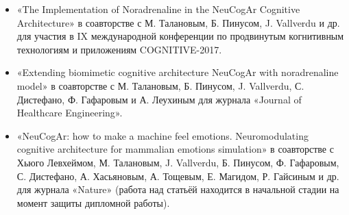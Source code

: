 \begin{itemize}
\item «The Implementation of Noradrenaline in the NeuCogAr Cognitive Architecture» в соавторстве с М. Талановым, Б. Пинусом, J. Vallverdu и др. для участия в IX международной конференции по продвинутым когнитивным технологиям и приложениям COGNITIVE-2017.
\item «Extending biomimetic cognitive architecture NeuCogAr with noradrenaline model» в соавторстве с М. Талановым, Б. Пинусом, J. Vallverdu, С. Дистефано, Ф. Гафаровым и А. Леухиным для журнала «Journal of Healthcare Engineering».
\item «NeuCogAr: how to make a machine feel emotions. Neuromodulating cognitive architecture for mammalian emotions simulation» в соавторстве с Хьюго Левхеймом, М. Талановым, J. Vallverdu, Б. Пинусом, Ф. Гафаровым, С. Дистефано, А. Хасьяновым, А. Тощевым, Е. Магидом, Р. Гайсиным и др. для журнала «Nature» (работа над статьёй находится в начальной стадии на момент защиты дипломной работы).
\end{itemize}
